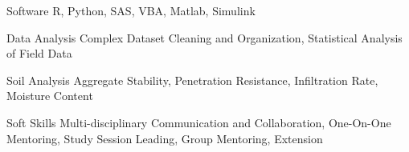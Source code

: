 

\begin{cvskills}

  \cvskill
    {Software } %
    {R, Python, SAS, VBA, Matlab, Simulink} %

\cvskill
    {Data Analysis} %
    {Complex Dataset Cleaning and Organization, Statistical Analysis of Field Data} %
    
\cvskill
    {Soil Analysis} %
    {Aggregate Stability, Penetration Resistance, Infiltration Rate, Moisture Content} %
    
\cvskill
    {Soft Skills} %
    {Multi-disciplinary Communication and Collaboration, One-On-One Mentoring, Study Session Leading, Group Mentoring, Extension} %


\end{cvskills}
